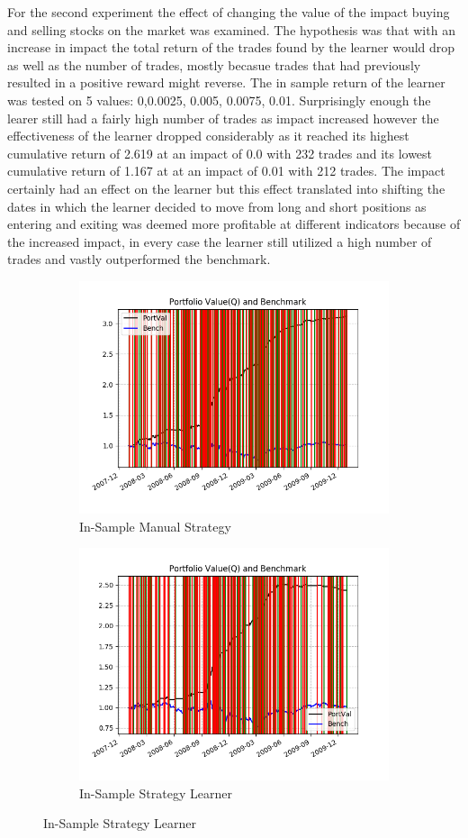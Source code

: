 \documentclass[12pt]{article}
\begin{document}
For the second experiment the effect of changing the value of the impact buying and selling stocks on the market was examined. The hypothesis was that with an increase in impact the total return of the trades found by the learner would drop as well as the number of trades, mostly becasue trades that had previously resulted in a positive reward might reverse. The in sample return of the learner was tested on 5 values: 0,0.0025, 0.005, 0.0075, 0.01. Surprisingly enough the learer still had a fairly high number of trades as impact increased however the effectiveness of the learner dropped considerably as it reached its highest cumulative return of 2.619 at an impact of 0.0 with 232 trades and its lowest cumulative return of 1.167 at at an impact of 0.01 with 212 trades. The impact certainly had an effect on the learner but this effect translated into shifting the dates in which the learner decided to move from long and short positions as entering and exiting was deemed more profitable at different indicators because of the increased impact, in every case the learner still utilized a high number of trades and vastly outperformed the benchmark. 

\begin{figure}
\begin{subfigure}{.5\textwidth}
\includegraphics[scale=0.5]{ise2l.png}
\caption{In-Sample Manual Strategy}
\end{subfigure}
\begin{subfigure}{.5\textwidth}
\includegraphics[scale=0.5]{ine2h.png}
\caption{In-Sample Strategy Learner}
\end{subfigure}
\end{figure}
\end{document}
